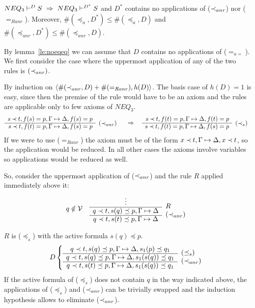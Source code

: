%
\begin{LEMMA}\label{le:noar}\label{le:noRanr} 
${NEQ_3}\vdash^{{D}}S\ \mathrel\Rightarrow\ {NEQ_3}\vdash^{{D^*}}S$
and $D^*$ contains no applications of ($\mathbin{\prec}_{anr}$) nor ($=_{Ranr}$).
Moreover, $\#(\preceq_a,D^*)\leq\#(\preceq_a,D)$ 
and $\#(\preceq_{anr},D^*)\leq\#(\preceq_{anr},D)$.
\end{LEMMA}
\begin{PROOF}
By lemma~\ref{le:noeqeq} we can assume that $D$ contains no applications of
($=_{a=}$). We first consider the case where the uppermost application of any of the
two rules is $(\mathbin{\prec}_{anr})$.

By induction on $\langle\#(\mathbin{\prec}_{anr},D)+\#(=_{Ranr}),h(D)\rangle$.
The basis
case of $h(D)=1$ is easy, since then the premise of the rule
would have to be an axiom and the rules are applicable only to few axioms of $NEQ_3$.
\[ \begin{array}{rl}
 s\Incl t, f(s)=p,\GSD, f(s)=p \\ \cline{1-1}
 s\Incl t, f(t)=p,\GSD, f(s)=p & \rabove{(\Incl_{anr})}
\end{array} 
\conv
\begin{array}{rl}
 s\Incl t, f(t)=p,\GSD, f(t)=p \\ \cline{1-1}
 s\Incl t, f(t)=p,\GSD, f(s)=p & \rabove{(\Incl_{s})}
\end{array}
\]
If we were to use ($=_{Ranr}$) the axiom must be of the form $x\mathbin{\prec} t,\Gamma\mathrel{\mapsto}\Delta,x\mathbin{\prec} t$, 
so the application would be reduced. In all other cases the axioms involve variables
so applications would be reduced as well.

So, consider the uppermost application of ($\mathbin{\prec}_{anr}$) and the rule $R$ applied
immediately above it:
\[ q\notin \cal V\ \ \ \begin{array}{cl}
  \vdots & \raisebox{-1.2ex}[1.5ex][0ex]{$R$} \\ \cline{1-1}
  q\prec t,s(q)\preceq p,\Gamma\Seq\Delta &
  \raisebox{-1.2ex}[1.5ex][0ex]{($\prec_{anr}$)} \\ \cline{1-1}
  q\prec t,s(t)\preceq p,\Gamma\Seq\Delta &
\end{array} \]
%
\begin{LS}
\item $R$ is ($\preceq_s$) with the active formula $s(q)\preceq p$. 
  \[D \left\{ \begin{array}{cl}
 q\prec t,s(q)\preceq p,\Gamma \Seq \Delta,s_1(p)\preceq q_1  &
  \raisebox{-1.2ex}[1.5ex][0ex]{$(\preceq_s)$} \\ \cline{1-1}
 q\prec t,s(q)\preceq p,\Gamma \Seq \Delta, s_1(s(q))\preceq q_1  &
\raisebox{-1.2ex}[1.5ex][0ex]{$(\prec_{anr})$} \\ \cline{1-1}
 q\prec t,s(t)\preceq p,\Gamma \Seq\Delta, s_1(s(q))\preceq q_1
\end{array} \right. \]
If the active formula of ($\preceq_s$) does not contain $q$ in the way 
indicated above, the applications of ($\preceq_s$) and ($\mathbin{\prec}_{anr}$) can be
trivially swapped and the induction hypothesis allows to eliminate 
($\mathbin{\prec}_{anr}$). 


\end{LS}
\end{PROOF}
